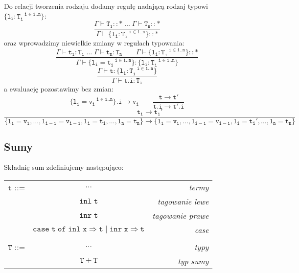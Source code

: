 \documentclass[11pt,leqno]{article}
\begin{document}
Do relacji tworzenia rodzaju dodamy regułę nadającą rodzaj typowi $\mathtt{\{l_i:T_i^{\;\;\;i \in 1..n}\}}$:~\[\mathtt{
             \frac{\Gamma \vdash T_1::\ast \;\dots\;\Gamma \vdash T_n::\ast}{\Gamma \vdash \{l_i:T_i^{\;\;\;i \in 1..n}\}::\ast}
		}
	\]
oraz wprowadzimy niewielkie zmiany w regułach typowania:~\[\mathtt{
             \frac{\Gamma \vdash t_1:T_1 \;\dots\;\Gamma \vdash t_n:T_n \hspace{2em} \Gamma \vdash \{l_i:T_i^{\;\;\;i \in 1..n}\}::\ast}{\Gamma \vdash \{l_i=t_i^{\;\;\;i \in 1..n}\}:\{l_i:T_i^{\;\;\;i \in 1..n}\}}
            }
	\]
 	\[\mathtt{
           \frac{\Gamma \vdash t : \{l_i:T_i^{\;\;\;i \in 1..n}\}}{\Gamma \vdash t.i : T_i} 
            }
	\]
a ewaluację pozostawimy bez zmian: \\
 	\[\mathtt{
                \{l_i=v_i^{\;\;\;i \in 1..n}\}.i \longrightarrow v_i
                \qquad
                \frac{t \longrightarrow t'}{t.i \longrightarrow t'.i}
		}
	\]
\small{
 	\[\mathtt{
                \frac{t_i \longrightarrow t_i'}{\{l_1=v_1, \dots, l_{i-1}=v_{i-1}, l_i=t_i, \dots, l_n=t_n\} \longrightarrow \{l_1=v_1, \dots, l_{i-1}=v_{i-1}, l_i=t_i', \dots, l_n=t_n\}}
		}
	\]
}

\subsection{Sumy}

Składnię sum zdefiniujemy następująco:\\

\begin{tabular}{| l c r |}
  \hline
  $\mathtt{t}$ ::= & $\dots$ & \textit{termy}  \\
   & $\mathtt{inl\;t}$ & \textit{tagowanie lewe} \\
   & $\mathtt{inr\;t}$ & \textit{tagowanie prawe} \\
   & $\mathtt{case\;t\;of\;inl\;x\Rightarrow t\;|\;inr\;x\Rightarrow t }$ & \textit{case}\\
   & & \\
  $\mathtt{T}$ ::= & $\dots$ & \textit{typy}  \\
   & $\mathtt{T+T}$ & \textit{typ sumy}\\
  \hline
\end{tabular} \\
\end{document}
